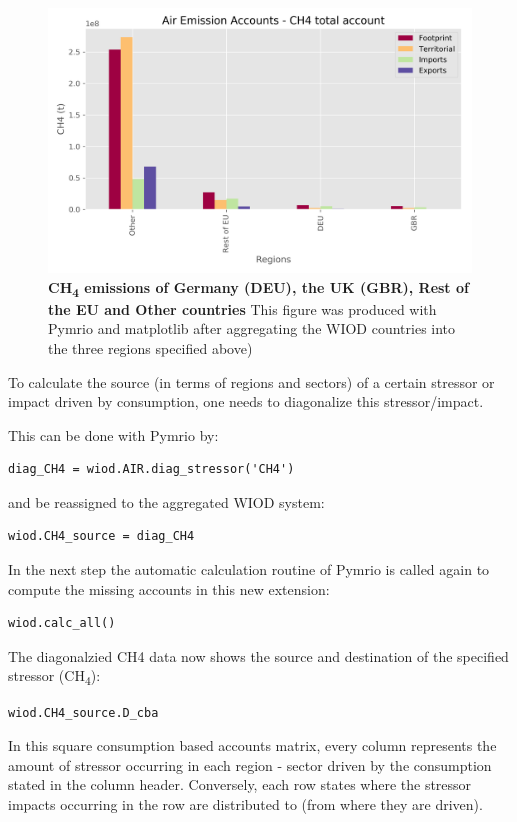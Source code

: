 \documentclass{jors}
\begin{document}
{  \begin{figure}[h!]
      \includegraphics[width=.9\textwidth]{./fig/airch4.png}
      \caption{\textbf{CH\textsubscript{4} emissions of Germany (DEU), the UK (GBR), Rest of the EU and Other countries}
      This figure was produced with Pymrio and matplotlib after aggregating the WIOD countries into the three regions specified above)}
      \end{figure}



To calculate the source (in terms of regions and sectors) of a certain stressor or impact driven by consumption, one needs to diagonalize this stressor/impact. 

This can be done with Pymrio by:
\begin{lstlisting}
diag_CH4 = wiod.AIR.diag_stressor('CH4')
\end{lstlisting}

and be reassigned to the aggregated WIOD system:
\begin{lstlisting}
wiod.CH4_source = diag_CH4
\end{lstlisting}

In the next step the automatic calculation routine of Pymrio is called again to compute the missing accounts in this new extension:

\begin{lstlisting}
wiod.calc_all()
\end{lstlisting}

The diagonalzied CH4 data now shows the source and destination of the specified stressor (CH\textsubscript{4}):
\begin{lstlisting}
wiod.CH4_source.D_cba
\end{lstlisting}

In this square consumption based accounts matrix, every column represents the amount of stressor occurring in each region - sector driven by the consumption stated in the column header. Conversely, each row states where the stressor impacts occurring in the row are distributed to (from where they are driven).

}
\end{document}
